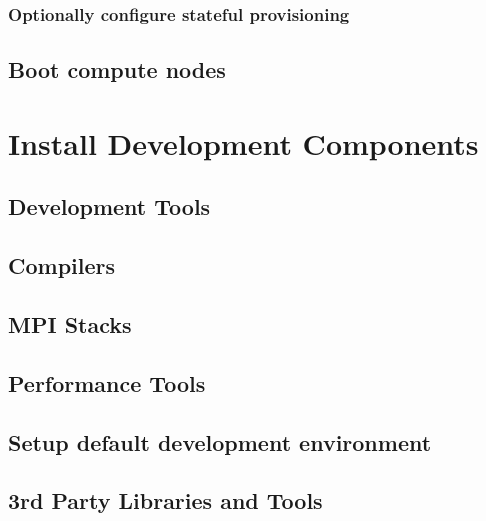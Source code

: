 \documentclass[letterpaper]{article}
\begin{document}
\vspace*{-0.1cm}
\subsubsection{Optionally configure stateful provisioning}


\clearpage
\subsection{Boot compute nodes} \label{sec:boot_computes}
 

\section{Install \OHPC{} Development Components}


\subsection{Development Tools} \label{sec:install_dev_tools}


\vspace*{-0.15cm}
\subsection{Compilers} \label{sec:install_compilers}


\subsection{MPI Stacks} \label{sec:mpi}


\subsection{Performance Tools} \label{sec:install_perf_tools}


\subsection{Setup default development environment}


\vspace*{0.3cm}
\subsection{3rd Party Libraries and Tools} \label{sec:3rdparty}



\vspace*{0.1cm}

\vspace*{0.5cm}
\end{document}
